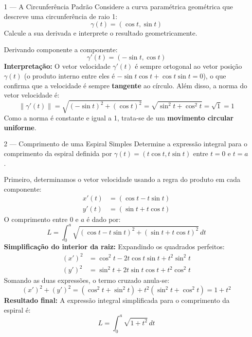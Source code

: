 \begin{exbox}{1 --- A Circunferência Padrão}
  Considere a curva paramétrica geométrica que descreve uma circunferência de raio 1:
  \[
    \gamma(t) = (\cos t, \sin t)
  \]
  Calcule a sua derivada e interprete o resultado geometricamente.
\end{exbox}
\begin{solbox}
  Derivando componente a componente:
  \[
    \gamma'(t) = (-\sin t, \cos t)
  \]
  \textbf{Interpretação:} O vetor velocidade $\gamma'(t)$ é sempre ortogonal ao vetor posição $\gamma(t)$ (o produto interno entre eles é $-\sin t \cos t + \cos t \sin t = 0$), o que confirma que a velocidade é sempre \textbf{tangente} ao círculo. Além disso, a norma do vetor velocidade é:
  \[
    \|\gamma'(t)\| = \sqrt{(-\sin t)^2 + (\cos t)^2} = \sqrt{\sin^2 t + \cos^2 t} = \sqrt{1} = 1
  \]
  Como a norma é constante e igual a 1, trata-se de um \textbf{movimento circular uniforme}.
\end{solbox}

\begin{exbox}{2 --- Comprimento de uma Espiral Simples}
  Determine a expressão integral para o comprimento da espiral definida por $\gamma(t)=(t\cos t, t\sin t)$ entre $t=0$ e $t=a$.
\end{exbox}
\begin{solbox}
  Primeiro, determinamos o vetor velocidade usando a regra do produto em cada componente:
  \begin{align*}
      x'(t) &= (\cos t - t\sin t) \\
      y'(t) &= (\sin t + t\cos t)
  \end{align*}
  O comprimento entre $0$ e $a$ é dado por:
  \[
    L = \int_0^a \sqrt{(\cos t - t\sin t)^2 + (\sin t + t\cos t)^2} \,dt
  \]
  \textbf{Simplificação do interior da raiz:}
  Expandindo os quadrados perfeitos:
  \begin{align*}
      (x')^2 &= \cos^2 t - 2t\cos t\sin t + t^2\sin^2 t \\
      (y')^2 &= \sin^2 t + 2t\sin t\cos t + t^2\cos^2 t
  \end{align*}
  Somando as duas expressões, o termo cruzado anula-se:
  \[
    (x')^2 + (y')^2 = (\cos^2 t + \sin^2 t) + t^2(\sin^2 t + \cos^2 t) = 1 + t^2
  \]
  \textbf{Resultado final:}
  A expressão integral simplificada para o comprimento da espiral é:
  \[
    \boxed{ L = \int_0^a \sqrt{1+t^2} \,dt }
  \]
\end{solbox}

